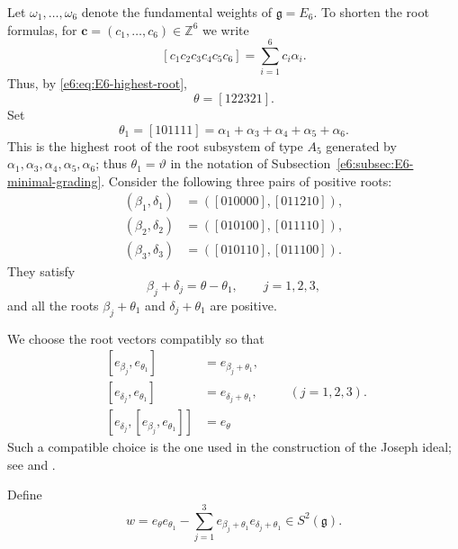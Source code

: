 \documentclass[11pt,reqno]{amsart}
\theoremstyle{definition}
\theoremstyle{remark}
\begin{document}
Let $\omega_1,\ldots,\omega_6$ denote the fundamental weights of
$\mathfrak g=E_6$.  To shorten the root formulas, for
$\mathbf c=(c_1,\ldots,c_6)\in\mathbb Z^6$ we write
\[
  [c_1c_2c_3c_4c_5c_6]
  =\sum_{i=1}^{6}c_i\alpha_i.
\]
Thus, by \eqref{e6:eq:E6-highest-root},
\[
  \theta=[122321].
\]
Set
\begin{equation*}
  \theta_1=[101111]
  =\alpha_1+\alpha_3+\alpha_4+\alpha_5+\alpha_6.
\end{equation*}
This is the highest root of the root subsystem of type $A_5$ generated by
$\alpha_1,\alpha_3,\alpha_4,\alpha_5,\alpha_6$; thus $\theta_1=\vartheta$ in the notation of
Subsection~\ref{e6:subsec:E6-minimal-grading}.  Consider the following three
pairs of positive roots:
\begin{equation*}
\begin{aligned}
  (\beta_1,\delta_1)&=([010000],[011210]),\\
  (\beta_2,\delta_2)&=([010100],[011110]),\\
  (\beta_3,\delta_3)&=([010110],[011100]).
\end{aligned}
\end{equation*}
They satisfy
\begin{equation}\label{e6:eq:root-pair-sum}
  \beta_j+\delta_j=\theta-\theta_1,
  \qquad j=1,2,3,
\end{equation}
and all the roots $\beta_j+\theta_1$ and $\delta_j+\theta_1$ are positive.

We choose the root vectors compatibly so that
\begin{equation}\label{e6:eq:Chevalley-normalization-w}
\begin{aligned}
  [e_{\beta_j},e_{\theta_1}]&=e_{\beta_j+\theta_1},\\
  [e_{\delta_j},e_{\theta_1}]&=e_{\delta_j+\theta_1},\\
  [e_{\delta_j},[e_{\beta_j},e_{\theta_1}]]&=e_\theta
\end{aligned}
\qquad (j=1,2,3).
\end{equation}
Such a compatible choice is the one used in the construction of the Joseph ideal;
see \cite[Chapter~IV, Proposition~11]{Garfinkle1982} and
\cite[Theorem~4.2 and Table~2]{ArakawaMoreau2018}.

Define
\begin{equation}\label{e6:eq:def-w}
  w
  =e_\theta e_{\theta_1}
   -\sum_{j=1}^{3}
    e_{\beta_j+\theta_1}e_{\delta_j+\theta_1}
  \in S^2(\mathfrak g).
\end{equation}
\end{document}
